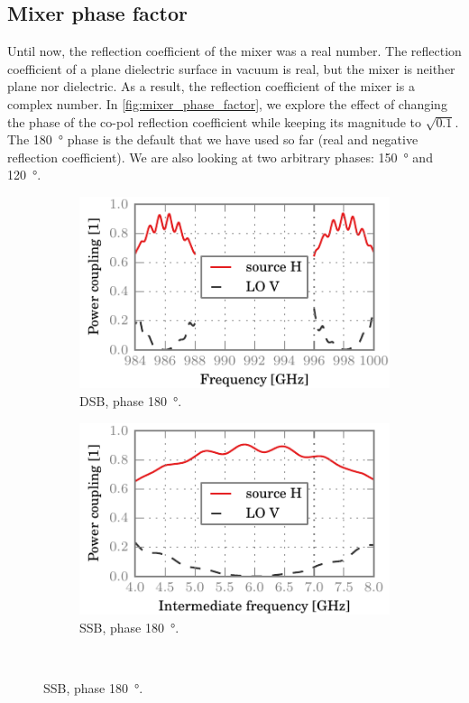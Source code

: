 \subsection{Mixer phase factor}
Until now, the reflection coefficient of the mixer was a real number.
The reflection coefficient of a plane dielectric surface in vacuum is real, but the mixer is neither plane nor dielectric.
As a result, the reflection coefficient of the mixer is a complex number.
In \cref{fig:mixer_phase_factor}, we explore the effect of changing the phase of the co-pol reflection coefficient while keeping its magnitude to $\sqrt{0.1}$.
The \SI{180}{\degree} phase is the default that we have used so far (real and negative reflection coefficient).
We are also looking at two arbitrary phases: \SI{150}{\degree} and \SI{120}{\degree}.
\begin{figure}[hbtp]
    \centering
    \begin{subfigure}[b]{.5\textwidth}
        \includegraphics{chapter_3/09_badrt_mhcrco_h_dsb}%
        \caption{DSB, phase \SI{180}{\degree}.}
    \end{subfigure}%
    \begin{subfigure}[b]{.5\textwidth}
        \includegraphics{chapter_3/09_badrt_mhcrco_h_ssb}%
        \caption{SSB, phase \SI{180}{\degree}.}
    \end{subfigure}%
    \\

\end{figure}
